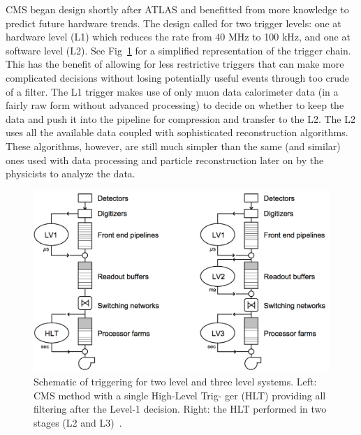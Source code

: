 	CMS began design shortly after ATLAS and benefitted from more knowledge to predict future hardware trends. The design called for two trigger levels: one at hardware level (L1) which reduces the rate from 40 MHz to 100 kHz, and one at software level (L2). See Fig~\ref{fig:trigger_chain} for a simplified representation of the trigger chain. This has the benefit of allowing for less restrictive triggers that can make more complicated decisions without losing potentially useful events through too crude of a filter. The L1 trigger makes use of only muon data calorimeter data (in a fairly raw form without advanced processing) to decide on whether to keep the data and push it into the pipeline for compression and transfer to the L2. The L2 uses all the available data coupled with sophisticated reconstruction algorithms. These algorithms, however, are still much simpler than the same (and similar) ones used with data processing and particle reconstruction later on by the physicists to analyze the data.\\
	\begin{figure}[h]
\begin{center}
\includegraphics[width=0.9\linewidth]{Figs/2level_3level_trigger.png}
\caption{\label{fig:trigger_chain}
Schematic of triggering for two level and three level systems. Left: CMS method with a single High-Level Trig-
ger (HLT) providing all filtering after the Level-1 decision. Right: the HLT performed in two stages (L2 and
L3)~\cite{triggertdr1}.
}
\end{center}
\end{figure}

